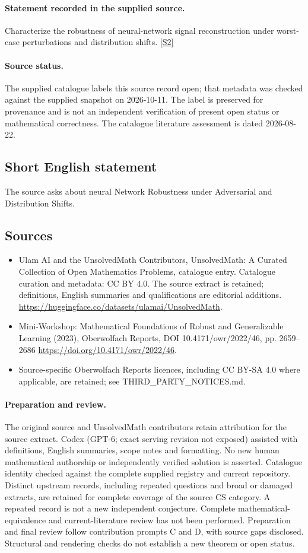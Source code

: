 \documentclass[11pt]{article}
\begin{document}
\paragraph{Statement recorded in the supplied source.}
Characterize the robustness of neural-network signal reconstruction under worst-case perturbations and distribution shifts. \href{https://doi.org/10.4171/owr/2022/46}{[S2]}
\paragraph{Source status.}
The supplied catalogue labels this source record open; that metadata was checked against the supplied snapshot on 2026-10-11. The label is preserved for provenance and is not an independent verification of present open status or mathematical correctness. The catalogue literature assessment is dated 2026-08-22.
\subsection{Short English statement}
The source asks about neural Network Robustness under Adversarial and Distribution Shifts.
\subsection{Sources}
\begin{itemize}
\item[S1] Ulam AI and the UnsolvedMath Contributors, UnsolvedMath: A Curated Collection of Open Mathematics Problems, catalogue entry. Catalogue curation and metadata: CC BY 4.0. The source extract is retained; definitions, English summaries and qualifications are editorial additions.
\url{https://huggingface.co/datasets/ulamai/UnsolvedMath}.
\item[S2] Mini-Workshop: Mathematical Foundations of Robust and Generalizable Learning (2023), Oberwolfach Reports, DOI 10.4171/owr/2022/46, pp. 2659--2686
\url{https://doi.org/10.4171/owr/2022/46}.
\item Source-specific Oberwolfach Reports licences, including CC BY-SA 4.0 where applicable, are retained; see THIRD\_PARTY\_NOTICES.md.
\end{itemize}
\paragraph{Preparation and review.}
The original source and UnsolvedMath contributors retain attribution for the source extract. Codex (GPT-6; exact serving revision not exposed) assisted with definitions, English summaries, scope notes and formatting. No new human mathematical authorship or independently verified solution is asserted. Catalogue identity checked against the complete supplied registry and current repository. Distinct upstream records, including repeated questions and broad or damaged extracts, are retained for complete coverage of the source CS category. A repeated record is not a new independent conjecture. Complete mathematical-equivalence and current-literature review has not been performed. Preparation and final review follow contribution prompts C and D, with source gaps disclosed. Structural and rendering checks do not establish a new theorem or open status.
\label{end:statement}
\end{document}
